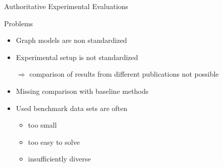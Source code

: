 \documentclass[utf8, xcolor=dvipsnames,ngerman]{beamer}
\begin{document}
\begin{frame}{Authoritative Experimental Evaluations}

\begin{block}{Problems}
 \begin{itemize}
  \item Graph models are non standardized 
  \item Experimental setup is not standardized
  \item[$\Rightarrow$] comparison of results from different publications not possible
  \item Missing comparison with baseline methods
  \item Used benchmark data sets are often 
  \begin{itemize}
    \item too small
    \item too easy to solve 
    \item insufficiently diverse
  \end{itemize}
 \end{itemize}
\end{block}
 
\end{frame}
\end{document}
